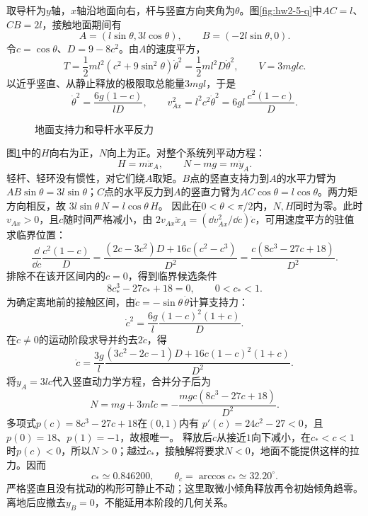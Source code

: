 \begin{solution}
取导杆为$y$轴，$x$轴沿地面向右，杆与竖直方向夹角为$\theta$。图\ref{fig:hw2-5-q}中$AC=l$、$CB=2l$，接触地面期间有
\[
 A=(l\sin\theta,3l\cos\theta),\qquad
 B=(-2l\sin\theta,0).
\]
令$c=\cos\theta$、$D=9-8c^2$。由$A$的速度平方，
\[
 T=\frac12ml^2(c^2+9\sin^2\theta)\dot\theta^2
 =\frac12ml^2D\dot\theta^2,\qquad V=3mglc.
\]
以近乎竖直、从静止释放的极限取总能量$3mgl$，于是
\[
 \dot\theta^2=\frac{6g(1-c)}{lD},\qquad
 v_{Ax}^2=l^2c^2\dot\theta^2
 =6gl\,\frac{c^2(1-c)}{D}.
\]
\begin{figure}[H]\centering
{}
\caption{地面支持力和导杆水平反力}\label{fig:hw2-5-s}
\end{figure}
图\ref{fig:hw2-5-s}中的$H$向右为正，$N$向上为正。对整个系统列平动方程：
\[
 H=m\ddot x_A,\qquad N-mg=m\ddot y_A.
\]
轻杆、轻环没有惯性，对它们绕$A$取矩。$B$点的竖直支持力到$A$的水平力臂为$AB\sin\theta=3l\sin\theta$；$C$点的水平反力到$A$的竖直力臂为$AC\cos\theta=l\cos\theta$。两力矩方向相反，故
$3l\sin\theta\,N=l\cos\theta\,H$。
因此在$0<\theta<\pi/2$内，$N,H$同时为零。此时$v_{Ax}>0$，且$c$随时间严格减小，由
$2v_{Ax}\ddot x_A=(\dd v_{Ax}^2/\dd c)\dot c$，可用速度平方的驻值求临界位置：
\[
 \frac{\dd}{\dd c}\frac{c^2(1-c)}D
 =\frac{(2c-3c^2)D+16c(c^2-c^3)}{D^2}
 =\frac{c(8c^3-27c+18)}{D^2}.
\]
排除不在该开区间内的$c=0$，得到临界候选条件
\[
 \boxed{8c_*^3-27c_*+18=0,\qquad 0<c_*<1}.
\]
为确定离地前的接触区间，由$\dot c=-\sin\theta\,\dot\theta$计算支持力：
\[
 \dot c^2=\frac{6g}{l}\frac{(1-c)^2(1+c)}D.
\]
在$\dot c\ne0$的运动阶段求导并约去$2\dot c$，得
\[
 \ddot c=\frac{3g}{l}
 \frac{(3c^2-2c-1)D+16c(1-c)^2(1+c)}{D^2}.
\]
将$y_A=3lc$代入竖直动力学方程，合并分子后为
\[
 N=mg+3ml\ddot c
 =-\frac{mgc(8c^3-27c+18)}{D^2}.
\]
多项式$p(c)=8c^3-27c+18$在$(0,1)$内有
$p'(c)=24c^2-27<0$，且$p(0)=18$、$p(1)=-1$，故根唯一。
释放后$c$从接近$1$向下减小，在$c_*<c<1$时$p(c)<0$，所以$N>0$；越过$c_*$，接触解将要求$N<0$，地面不能提供这样的拉力。因而
\[
 \boxed{c_*\simeq0.846200,\qquad\theta_c=\arccos c_*\simeq32.20^\circ}.
\]
严格竖直且没有扰动的构形可静止不动；这里取微小倾角释放再令初始倾角趋零。离地后应撤去$y_B=0$，不能延用本阶段的几何关系。
\end{solution}



